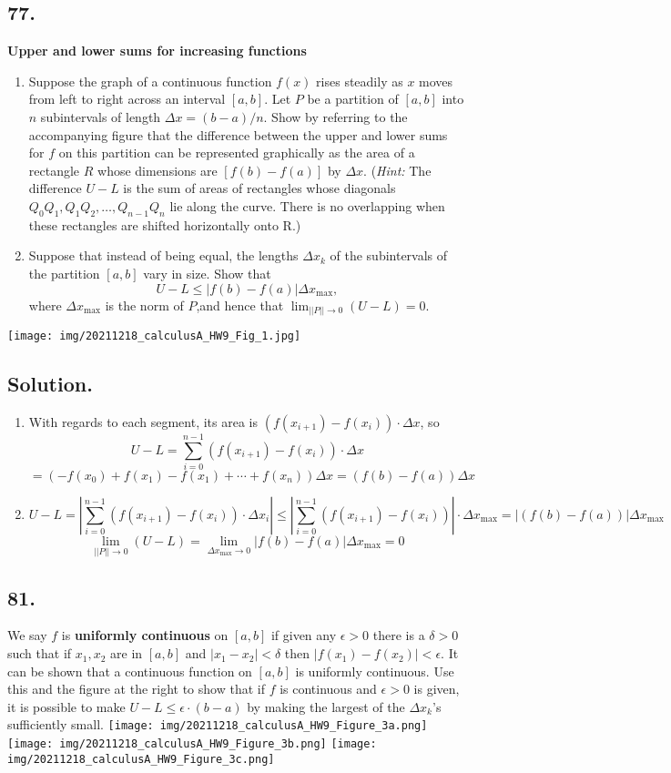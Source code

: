 \documentclass{article}
\begin{document}
\subsection*{77.}
\textbf{Upper and lower sums for increasing functions}
\begin{enumerate} [label=\textbf{\alph*.}]
    \item Suppose the graph of a continuous function $f(x)$ rises steadily as $x$ moves from left to right across an interval $[a,b]$. Let $P$ be a partition of $[a,b]$ into $n$ subintervals of length $\Delta x=(b-a)/n$. Show by referring to the accompanying figure that the difference between the upper and lower sums for $f$ on this partition can be represented graphically as the area of a rectangle $R$ whose dimensions are $[f(b)-f(a)]$ by $\Delta x$. (\textit{Hint:} The difference $U-L$ is the sum of areas of rectangles whose diagonals $Q_0Q_1,Q_1Q_2,\dots,Q_{n-1}Q_n$ lie along the curve. There is no overlapping when these rectangles are shifted horizontally onto R.)
    \item Suppose that instead of being equal, the lengths $\Delta x_k$ of the subintervals of the partition $[a,b]$ vary in size. Show that 
    \[U-L \leq |f(b)-f(a)|\Delta x_{\mathrm{max}},\]
    where $\Delta x_{\mathrm{max}}$ is the norm of $P$,and hence that $\lim_{||P||\to 0}(U-L)=0$.
\end{enumerate}
\texttt{[image: img/20211218\_calculusA\_HW9\_Fig\_1.jpg]}
\subsection*{Solution.}
\begin{enumerate} [label=\textbf{\alph*.}]
    \item With regards to each segment, its area is $(f(x_{i+1})-f(x_i))\cdot \Delta x$,
    so 
    \[U-L=\sum_{i=0}^{n-1} (f(x_{i+1})-f(x_i))\cdot \Delta x\]
    \[=(-f(x_0)+f(x_1)-f(x_1)+\cdots +f(x_n))\Delta x=(f(b)-f(a))\Delta x\]
    \item 
    \[U-L=\left\vert\sum_{i=0}^{n-1} (f(x_{i+1})-f(x_i))\cdot \Delta x_i\right|\leq\left|\sum_{i=0}^{n-1} (f(x_{i+1})-f(x_i))\right|\cdot \Delta x_{\mathrm{max}}=|(f(b)-f(a))|\Delta x_{\mathrm{max}}\]
    \[\lim_{||P||\to 0}(U-L)=\lim_{\Delta x_\mathrm{max}\to 0} |f(b)-f(a)|\Delta x_\mathrm{max}=0\]
\end{enumerate}
\subsection*{81.}
We say $f$ is \textbf{uniformly continuous} on $[a,b]$ if given any $\epsilon>0$ there is a $\delta>0$ such that if $x_1,x_2$ are in $[a,b]$ and $|x_1-x_2|<\delta$ then $|f(x_1)-f(x_2)|<\epsilon$. It can be shown that a continuous function on $[a,b]$ is uniformly continuous. Use this and the figure at the right to show that if $f$ is continuous and $\epsilon>0$ is given, it is possible to make $U-L\leq \epsilon\cdot(b-a)$ by making the largest of the $\Delta x_k$'s sufficiently small.\newline
\texttt{[image: img/20211218\_calculusA\_HW9\_Figure\_3a.png]}
\texttt{[image: img/20211218\_calculusA\_HW9\_Figure\_3b.png]}
\texttt{[image: img/20211218\_calculusA\_HW9\_Figure\_3c.png]}
\end{document}
